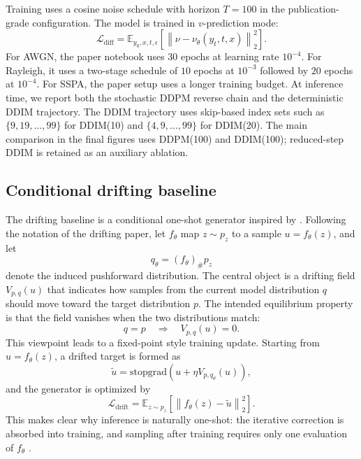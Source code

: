 Training uses a cosine noise schedule with horizon \(T=100\) in the publication-grade configuration.
The model is trained in \(v\)-prediction mode:
\begin{equation}
\mathcal{L}_{\text{diff}}
=
\mathbb{E}_{y_0, x, t, \epsilon}
\left[
\left\|
\nu - \nu_\theta(y_t, t, x)
\right\|_2^2
\right].
\end{equation}
For AWGN, the paper notebook uses \(30\) epochs at learning rate \(10^{-4}\).
For Rayleigh, it uses a two-stage schedule of \(10\) epochs at \(10^{-3}\) followed by \(20\) epochs at \(10^{-4}\).
For SSPA, the paper setup uses a longer training budget.
At inference time, we report both the stochastic DDPM reverse chain and the deterministic DDIM trajectory.
The DDIM trajectory uses skip-based index sets such as
\( \{9,19,\ldots,99\} \) for DDIM(10) and
\( \{4,9,\ldots,99\} \) for DDIM(20).
The main comparison in the final figures uses DDPM(100) and DDIM(100); reduced-step DDIM is retained as an auxiliary ablation.

\subsection{Conditional drifting baseline}
The drifting baseline is a conditional one-shot generator inspired by \cite{drifting}.
Following the notation of the drifting paper, let \(f_\theta\) map \(z \sim p_z\) to a sample \(u = f_\theta(z)\), and let
\begin{equation}
q_\theta = (f_\theta)_\# p_z
\end{equation}
denote the induced pushforward distribution.
The central object is a drifting field \(V_{p,q}(u)\) that indicates how samples from the current model distribution \(q\) should move toward the target distribution \(p\).
The intended equilibrium property is that the field vanishes when the two distributions match:
\begin{equation}
q = p
\quad \Longrightarrow \quad
V_{p,q}(u) = 0.
\end{equation}
This viewpoint leads to a fixed-point style training update.
Starting from \(u = f_\theta(z)\), a drifted target is formed as
\begin{equation}
\tilde{u}
=
\mathrm{stopgrad}\!\left(
u + \eta V_{p,q_\theta}(u)
\right),
\end{equation}
and the generator is optimized by
\begin{equation}
\mathcal{L}_{\text{drift}}
=
\mathbb{E}_{z \sim p_z}
\left[
\left\|
f_\theta(z) - \tilde{u}
\right\|_2^2
\right].
\end{equation}
This makes clear why inference is naturally one-shot: the iterative correction is absorbed into training, and sampling after training requires only one evaluation of \(f_\theta\) \cite{drifting,driftingproj}.

